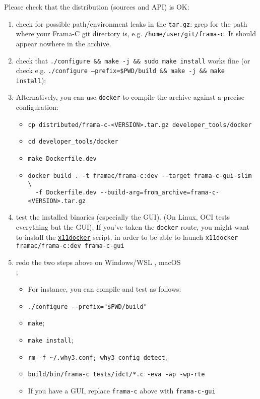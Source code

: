Please check that the distribution (sources and API) is OK:
\begin{enumerate}
\item check for possible path/environment leaks in the \texttt{tar.gz}:
  grep for the path where your Frama-C git directory is, e.g.
  \texttt{/home/user/git/frama-c}. It should appear nowhere in the archive.
\item check that \texttt{./configure \&\& make -j \&\& sudo make install} works fine
  (or check e.g. \texttt{./configure --prefix=\$PWD/build \&\& make -j \&\& make install});
\item Alternatively, you can use \texttt{docker} to compile the archive against a
  precise configuration:
  \begin{itemize}
    \item \verb+cp distributed/frama-c-<VERSION>.tar.gz developer_tools/docker+
    \item \verb+cd developer_tools/docker+
    \item \verb+make Dockerfile.dev+
    \item \verb+docker build . -t framac/frama-c:dev --target frama-c-gui-slim \+\\
          \verb+  -f Dockerfile.dev --build-arg=from_archive=frama-c-<VERSION>.tar.gz+
    \end{itemize}
\item test the installed binaries (especially the GUI). (On Linux, OCI tests
  everything but the GUI); If you've taken the \texttt{docker} route, you might
  want to install the \href{https://github.com/mviereck/x11docker}{\texttt{x11docker}} script,
  in order to be able to launch
  \verb+x11docker framac/frama-c:dev frama-c-gui+
\item redo the two steps above on Windows/WSL ,
  macOS \\;
  \begin{itemize}
  \item For instance, you can compile and test as follows:
  \item \verb+./configure --prefix="$PWD/build"+
  \item \verb+make+;
  \item \verb+make install+;
  \item \verb+rm -f ~/.why3.conf; why3 config detect+;
  \item \verb+build/bin/frama-c tests/idct/*.c -eva -wp -wp-rte+
  \item If you have a GUI, replace \verb+frama-c+ above with \verb+frama-c-gui+

\end{itemize}
\end{enumerate}
